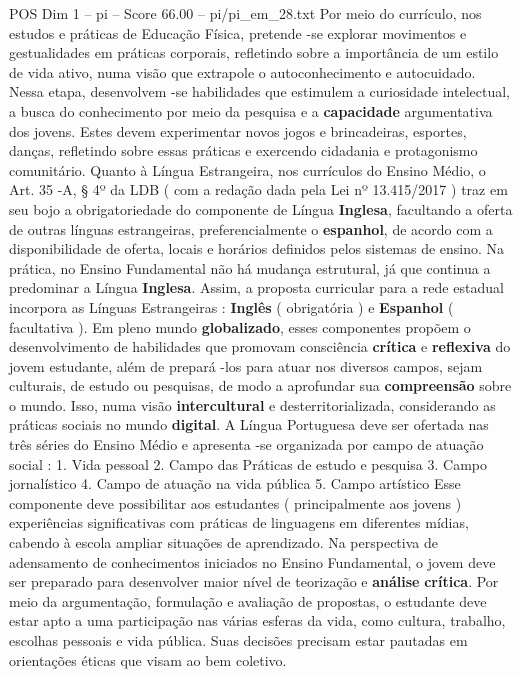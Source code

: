 \begin{textsample}{POS Dim 1 – pi – Score 66.00 – pi/pi\_em\_28.txt}
Por meio do currículo, nos estudos e práticas de Educação Física, pretende -se explorar movimentos e gestualidades em práticas corporais, refletindo sobre a importância de um estilo de vida ativo, numa visão que extrapole o autoconhecimento e autocuidado.
Nessa etapa, desenvolvem -se habilidades que estimulem a curiosidade intelectual, a busca do conhecimento por meio da pesquisa e a \textbf{capacidade} argumentativa dos jovens.
Estes devem experimentar novos jogos e brincadeiras, esportes, danças, refletindo sobre essas práticas e exercendo cidadania e protagonismo comunitário.
Quanto à Língua Estrangeira, nos currículos do Ensino Médio, o Art. 35 -A, § 4º da LDB ( com a redação dada pela Lei nº 13.415/2017 ) traz em seu bojo a obrigatoriedade do componente de Língua \textbf{Inglesa}, facultando a oferta de outras línguas estrangeiras, preferencialmente o \textbf{espanhol}, de acordo com a disponibilidade de oferta, locais e horários definidos pelos sistemas de ensino.
Na prática, no Ensino Fundamental não há mudança estrutural, já que continua a predominar a Língua \textbf{Inglesa}.
Assim, a proposta curricular para a rede estadual incorpora as Línguas Estrangeiras : \textbf{Inglês} ( obrigatória ) e \textbf{Espanhol} ( facultativa ).
Em pleno mundo \textbf{globalizado}, esses componentes propõem o desenvolvimento de habilidades que promovam consciência \textbf{crítica} e \textbf{reflexiva} do jovem estudante, além de prepará -los para atuar nos diversos campos, sejam culturais, de estudo ou pesquisas, de modo a aprofundar sua \textbf{compreensão} sobre o mundo.
Isso, numa visão \textbf{intercultural} e desterritorializada, considerando as práticas sociais no mundo \textbf{digital}.
A Língua Portuguesa deve ser ofertada nas três séries do Ensino Médio e apresenta -se organizada por campo de atuação social : 1.
Vida pessoal 2.
Campo das Práticas de estudo e pesquisa 3.
Campo jornalístico 4.
Campo de atuação na vida pública 5.
Campo artístico Esse componente deve possibilitar aos estudantes ( principalmente aos jovens ) experiências significativas com práticas de linguagens em diferentes mídias, cabendo à escola ampliar situações de aprendizado.
Na perspectiva de adensamento de conhecimentos iniciados no Ensino Fundamental, o jovem deve ser preparado para desenvolver maior nível de teorização e \textbf{análise} \textbf{crítica}.
Por meio da argumentação, formulação e avaliação de propostas, o estudante deve estar apto a uma participação nas várias esferas da vida, como cultura, trabalho, escolhas pessoais e vida pública.
Suas decisões precisam estar pautadas em orientações éticas que visam ao bem coletivo.

\end{textsample}
